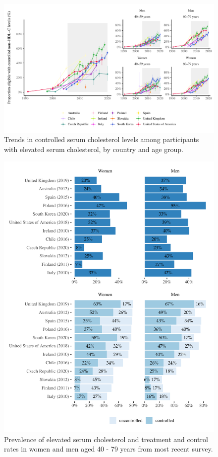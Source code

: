 \documentclass[12pt]{article}
\begin{document}
\begin{refsection}
\begin{landscape}
    \begin{figure}[p]
        \centering
        \includegraphics{../3_figures/controlled.pdf}
        \caption{Trends in controlled serum cholesterol levels among participants with elevated serum cholesterol, by country and age group.}
        \label{fig:uncontrolled}
    \end{figure}
\end{landscape}

\begin{figure}[p]
    \centering
    \includegraphics[width=\textwidth]{../3_figures/recent.pdf}
    \caption{Prevalence of elevated serum cholesterol and treatment and control rates in women and men aged 40 - 79 years from most recent survey.}
    \label{fig:recent}
\end{figure}


\end{refsection}
\end{document}
